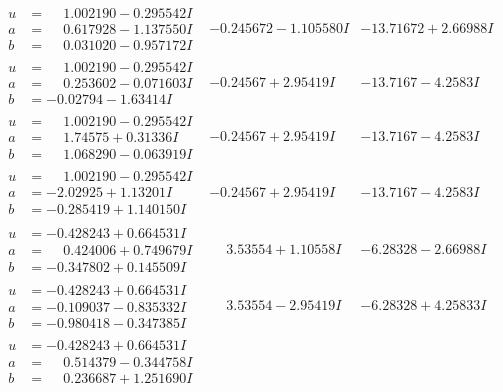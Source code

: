 \documentclass[1p]{elsarticle_modified}
\theoremstyle{definition}
\begin{document}
$$\begin{array}{c|c|c}
\begin{aligned}
u &= \phantom{-}1.002190 - 0.295542 I \\
a &= \phantom{-}0.617928 - 1.137550 I \\
b &= \phantom{-}0.031020 - 0.957172 I\end{aligned}
 & -0.245672 - 1.105580 I & -13.71672 + 2.66988 I \\ \hline\begin{aligned}
u &= \phantom{-}1.002190 - 0.295542 I \\
a &= \phantom{-}0.253602 - 0.071603 I \\
b &= -0.02794 - 1.63414 I\end{aligned}
 & -0.24567 + 2.95419 I & -13.7167 - 4.2583 I \\ \hline\begin{aligned}
u &= \phantom{-}1.002190 - 0.295542 I \\
a &= \phantom{-}1.74575 + 0.31336 I \\
b &= \phantom{-}1.068290 - 0.063919 I\end{aligned}
 & -0.24567 + 2.95419 I & -13.7167 - 4.2583 I \\ \hline\begin{aligned}
u &= \phantom{-}1.002190 - 0.295542 I \\
a &= -2.02925 + 1.13201 I \\
b &= -0.285419 + 1.140150 I\end{aligned}
 & -0.24567 + 2.95419 I & -13.7167 - 4.2583 I \\ \hline\begin{aligned}
u &= -0.428243 + 0.664531 I \\
a &= \phantom{-}0.424006 + 0.749679 I \\
b &= -0.347802 + 0.145509 I\end{aligned}
 & \phantom{-}3.53554 + 1.10558 I & -6.28328 - 2.66988 I \\ \hline\begin{aligned}
u &= -0.428243 + 0.664531 I \\
a &= -0.109037 - 0.835332 I \\
b &= -0.980418 - 0.347385 I\end{aligned}
 & \phantom{-}3.53554 - 2.95419 I & -6.28328 + 4.25833 I \\ \hline\begin{aligned}
u &= -0.428243 + 0.664531 I \\
a &= \phantom{-}0.514379 - 0.344758 I \\
b &= \phantom{-}0.236687 + 1.251690 I\end{aligned}

\end{array}$$
\end{document}
